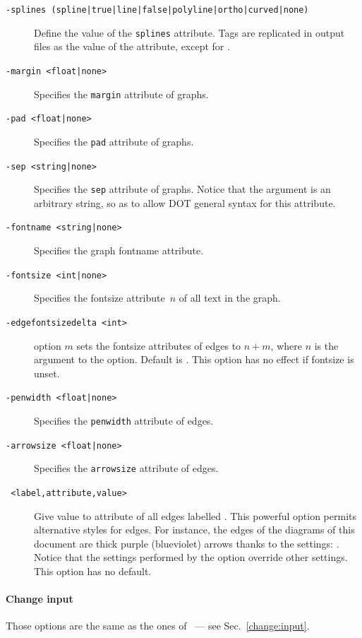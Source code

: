 \begin{description}
\item[{\tt -splines (spline|true|line|false|polyline|ortho|curved|none)}]
Define the value of the \texttt{splines} attribute. Tags are replicated in
output files as the value of the attribute, except for .
\item[{\tt -margin <float|none>}] Specifies the \texttt{margin} attribute of graphs.
\item[{\tt -pad <float|none>}] Specifies the \texttt{pad} attribute of graphs.
\item[{\tt -sep <string|none>}] Specifies the \texttt{sep} attribute of graphs.
Notice that the argument is an arbitrary string, so as to allow DOT general
syntax for this attribute.
\item[{\tt -fontname <string|none>}] Specifies the graph fontname attribute.
\item[{\tt -fontsize <int|none>}] Specifies the fontsize attribute~$n$ of all
text in the graph.
\item[{\tt -edgefontsizedelta <int>}] option $m$ sets
the fontsize attributes of edges to $n+m$, where $n$ is the argument to
the  option. Default is . This option has  no effect if
fontsize is unset.
\item[{\tt -penwidth <float|none>}] Specifies the \texttt{penwidth} attribute of
edges.
\item[{\tt -arrowsize <float|none>}] Specifies the \texttt{arrowsize}
attribute of edges.
\item[{\tt {} <label,attribute,value>}]
Give value  to attribute   of all edges labelled
. This powerful option  permits alternative styles for edges.
For instance, the  edges of the diagrams of this document
are thick purple (blueviolet) arrows thanks to the settings:
. Notice that the settings performed
by the  option override other settings.
This option has no default.
\end{description}

\paragraph*{Change input}
Those options are the same as the ones
of~\litmus{} --- see Sec.~\ref{change:input}.

